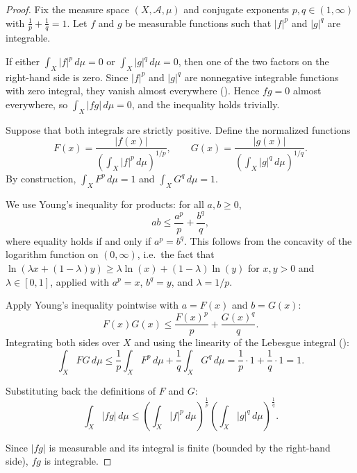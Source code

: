 \begin{proof}
    Fix the measure space $(X, \mathcal{A}, \mu)$ and conjugate exponents $p, q \in (1,\infty)$ with $\frac{1}{p} + \frac{1}{q} = 1$. Let $f$ and $g$ be measurable functions such that $|f|^p$ and $|g|^q$ are integrable.

    If either $\int_X |f|^p\,d\mu = 0$ or $\int_X |g|^q\,d\mu = 0$, then one of the two factors on the right-hand side is zero. Since $|f|^p$ and $|g|^q$ are nonnegative integrable functions with zero integral, they vanish almost everywhere (). Hence $fg = 0$ almost everywhere, so $\int_X |fg|\,d\mu = 0$, and the inequality holds trivially.

    Suppose that both integrals are strictly positive. Define the normalized functions
    $$F(x) = \frac{|f(x)|}{\left(\int_X |f|^p\,d\mu\right)^{1/p}}, \qquad G(x) = \frac{|g(x)|}{\left(\int_X |g|^q\,d\mu\right)^{1/q}}.$$
    By construction, $\int_X F^p\,d\mu = 1$ and $\int_X G^q\,d\mu = 1$.

    We use Young's inequality for products: for all $a, b \geq 0$,
    $$ab \leq \frac{a^p}{p} + \frac{b^q}{q},$$
    where equality holds if and only if $a^p = b^q$. This follows from the concavity of the logarithm function on $(0,\infty)$, i.e.\ the fact that $\ln(\lambda x + (1-\lambda)y) \geq \lambda \ln(x) + (1-\lambda)\ln(y)$ for $x,y > 0$ and $\lambda \in [0,1]$, applied with $a^p = x$, $b^q = y$, and $\lambda = 1/p$.

    Apply Young's inequality pointwise with $a = F(x)$ and $b = G(x)$:
    $$F(x)G(x) \leq \frac{F(x)^p}{p} + \frac{G(x)^q}{q}.$$
    Integrating both sides over $X$ and using the linearity of the Lebesgue integral ():
    $$\int_X F G \,d\mu \leq \frac{1}{p}\int_X F^p\,d\mu + \frac{1}{q}\int_X G^q\,d\mu = \frac{1}{p} \cdot 1 + \frac{1}{q} \cdot 1 = 1.$$

    Substituting back the definitions of $F$ and $G$:
    $$\int_X |fg|\,d\mu \leq \left(\int_X |f|^p\,d\mu\right)^{\frac{1}{p}} \left(\int_X |g|^q\,d\mu\right)^{\frac{1}{q}}.$$

    Since $|fg|$ is measurable and its integral is finite (bounded by the right-hand side), $fg$ is integrable.
\end{proof}
